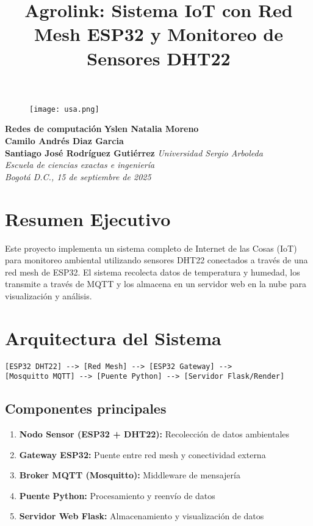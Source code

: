 \documentclass[12pt]{article}
\title{
\textbf{Agrolink}: Sistema IoT con Red Mesh ESP32 y Monitoreo de Sensores DHT22
}
\author{}
\date{}
\begin{document}
\maketitle

\begin{figure}[!t]
\centering
\texttt{[image: usa.png]}
\end{figure}

\begin{center}
{\Large \bf Redes de computación}
\vskip 0.5cm 
{\bf Yslen Natalia Moreno  \\  Camilo Andrés Diaz Garcia\\ Santiago José Rodríguez Gutiérrez} 
\vskip 2cm
{\it  Universidad Sergio Arboleda \\Escuela de ciencias exactas e ingenier\'ia \\ 
Bogot\'a D.C., 15 de septiembre de 2025}
\end{center}

\clearpage
\tableofcontents
\newpage 

\section{Resumen Ejecutivo}

Este proyecto implementa un sistema completo de Internet de las Cosas (IoT) para monitoreo ambiental utilizando sensores DHT22 conectados a través de una red mesh de ESP32. El sistema recolecta datos de temperatura y humedad, los transmite a través de MQTT y los almacena en un servidor web en la nube para visualización y análisis.

\section{Arquitectura del Sistema}

\begin{verbatim}
[ESP32 DHT22] --> [Red Mesh] --> [ESP32 Gateway] --> 
[Mosquitto MQTT] --> [Puente Python] --> [Servidor Flask/Render]
\end{verbatim}

\subsection{Componentes principales}
\begin{enumerate}
    \item \textbf{Nodo Sensor (ESP32 + DHT22):} Recolección de datos ambientales
    \item \textbf{Gateway ESP32:} Puente entre red mesh y conectividad externa
    \item \textbf{Broker MQTT (Mosquitto):} Middleware de mensajería
    \item \textbf{Puente Python:} Procesamiento y reenvío de datos
    \item \textbf{Servidor Web Flask:} Almacenamiento y visualización de datos
\end{enumerate}
\end{document}
